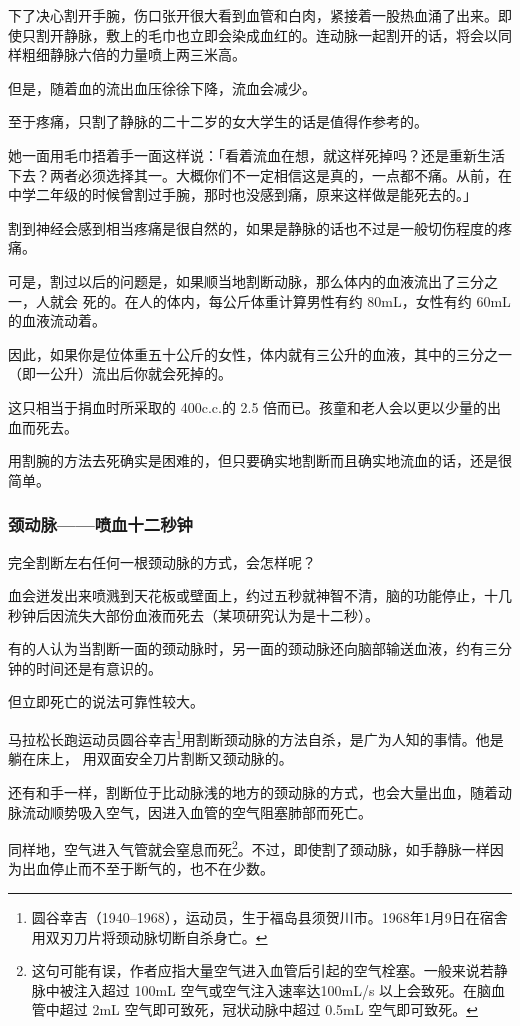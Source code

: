 \documentclass[UTF8]{ctexart}
\begin{document}
下了决心割开手腕，伤口张开很大看到血管和白肉，紧接着一股热血涌了出来。即使只割开静脉，敷上的毛巾也立即会染成血红的。连动脉一起割开的话，将会以同样粗细静脉六倍的力量喷上两三米高。

但是，随着血的流出血压徐徐下降，流血会减少。 

至于疼痛，只割了静脉的二十二岁的女大学生的话是值得作参考的。

她一面用毛巾捂着手一面这样说：「看着流血在想，就这样死掉吗？还是重新生活下去？两者必须选择其一。大概你们不一定相信这是真的，一点都不痛。从前，在中学二年级的时候曾割过手腕，那时也没感到痛，原来这样做是能死去的。」 

割到神经会感到相当疼痛是很自然的，如果是静脉的话也不过是一般切伤程度的疼痛。

可是，割过以后的问题是，如果顺当地割断动脉，那么体内的血液流出了三分之一，人就会 死的。在人的体内，每公斤体重计算男性有约 80mL，女性有约 60mL 的血液流动着。

因此，如果你是位体重五十公斤的女性，体内就有三公升的血液，其中的三分之一（即一公升）流出后你就会死掉的。

这只相当于捐血时所采取的 400c.c.的 2.5 倍而已。孩童和老人会以更以少量的出血而死去。

用割腕的方法去死确实是困难的，但只要确实地割断而且确实地流血的话，还是很简单。

\subsubsection*{颈动脉——喷血十二秒钟}

完全割断左右任何一根颈动脉的方式，会怎样呢？

血会迸发出来喷溅到天花板或壁面上，约过五秒就神智不清，脑的功能停止，十几秒钟后因流失大部份血液而死去（某项研究认为是十二秒）。

有的人认为当割断一面的颈动脉时，另一面的颈动脉还向脑部输送血液，约有三分钟的时间还是有意识的。

但立即死亡的说法可靠性较大。

马拉松长跑运动员圆谷幸吉\footnote{圆谷幸吉（1940–1968），运动员，生于福岛县须贺川市。1968年1月9日在宿舎用双刃刀片将颈动脉切断自杀身亡。}用割断颈动脉的方法自杀，是广为人知的事情。他是躺在床上， 用双面安全刀片割断又颈动脉的。

还有和手一样，割断位于比动脉浅的地方的颈动脉的方式，也会大量出血，随着动脉流动顺势吸入空气，因进入血管的空气阻塞肺部而死亡。

同样地，空气进入气管就会窒息而死\footnote{这句可能有误，作者应指大量空气进入血管后引起的空气栓塞。一般来说若静脉中被注入超过 100mL 空气或空气注入速率达100mL/s 以上会致死。在脑血管中超过 2mL 空气即可致死，冠状动脉中超过 0.5mL 空气即可致死。}。不过，即使割了颈动脉，如手静脉一样因为出血停止而不至于断气的，也不在少数。
\end{document}
